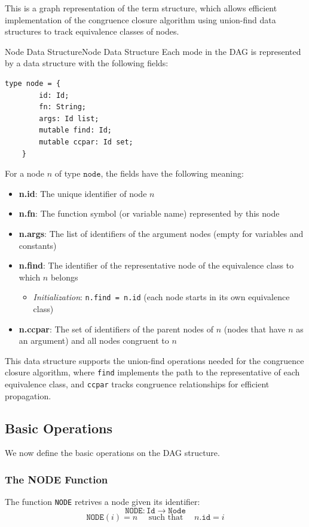 \documentclass[a4paper]{article}
\theoremstyle{definition}
\begin{document}
This is a graph representation of the term structure, which allows efficient implementation of the congruence 
closure algorithm using union-find data structures to track equivalence classes of nodes.
\begin{definition}{Node Data Structure}{Node Data Structure}
Each mode in the DAG is represented by a data structure with the following fields:
\begin{lstlisting}[style=ocamlpseudo]
	type node = {
		id: Id;
		fn: String;
		args: Id list;
		mutable find: Id;
		mutable ccpar: Id set;
	}
\end{lstlisting}
For a node \( n \) of type \( \texttt{node} \), the fields have the following meaning:
\begin{itemize}
	\item \textbf{n.id}: The unique identifier of node \( n \)   
	\item \textbf{n.fn}: The function symbol (or variable name) represented by this node 
	\item \textbf{n.args}: The list of identifiers of the argument nodes (empty for variables and constants)
	\item \textbf{n.find}: The identifier of the representative node of the equivalence class to which \( n \) belongs
	\begin{itemize}
		\item \textit{Initialization}: \texttt{n.find = n.id} (each node starts in its own equivalence class)
	\end{itemize}
	\item \textbf{n.ccpar}: The set of identifiers of the parent nodes of \( n \) (nodes that have \( n \) as an argument) and all nodes congruent to \( n \)
\end{itemize}	
\end{definition}
This data structure supports the union-find operations needed for the congruence closure algorithm, where \texttt{find}
implements the path to the representative of each equivalence class, and \texttt{ccpar} tracks congruence relationships
for efficient propagation.
\subsection{Basic Operations}
We now define the basic operations on the DAG structure.
\subsubsection{The NODE Function}
The function \texttt{NODE} retrives a node given its identifier:
\[
  \texttt{NODE}: \texttt{Id} \rightarrow \texttt{Node}
\]
\[
  \texttt{NODE}(i) = n \quad \text{ such that } \quad n.\texttt{id} = i
\]
\end{document}
